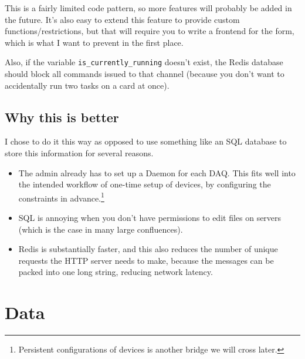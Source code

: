 \documentclass{article}
\begin{document}
This is a fairly limited code pattern, so more features will probably be added in the future. It's also easy to extend this feature to provide custom functions/restrictions, but that will require you to write a frontend for the form, which is what I want to prevent in the first place.

Also, if the variable \texttt{is\_currently\_running} doesn't exist, the Redis database should block all commands issued to that channel (because you don't want to accidentally run two tasks on a card at once).

\subsection{Why this is better}
I chose to do it this way as opposed to use something like an SQL database to store this information for several reasons.
\begin{itemize}
	\item The admin already has to set up a Daemon for each DAQ. This fits well into the intended workflow of one-time setup of devices, by configuring the constraints in advance.\footnote{Persistent configurations of devices is another bridge we will cross later.}
			\item SQL is annoying when you don't have permissions to edit files on servers (which is the case in many large confluences).
			\item Redis is substantially faster, and this also reduces the number of unique requests the HTTP server needs to make, because the messages can be packed into one long string, reducing network latency.
\end{itemize}

\section{Data}
\end{document}
